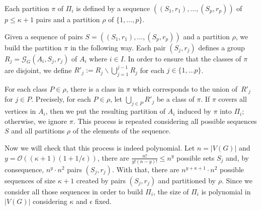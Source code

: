 Each partition \(\pi\) of \(\Pi_i\) is defined by a sequence \(((S_1, r_1), \dots, (S_p, r_p))\) of \(p \le \kappa + 1\) pairs and a partition \(\rho\) of \(\{1, \dots, p\}\).

Given a sequence of pairs \(S = ((S_1, r_1), \dots, (S_p, r_p))\) and a partition \(\rho\), we build the partition \(\pi\) in the following way. Each pair \((S_j, r_j)\) defines a group \(R_j = \mathcal{G}_G(A_i, S_j, r_j)\) of \(A_i\) where \(i\in I\). In order to ensure that the classes of \(\pi\) are disjoint, we define \(R'_j := R_j \backslash \bigcup^{j-1}_{j=1} R_j\) for each $j \in \{1, \ldots p\}$.

For each class \(P \in \rho\), there is a class in \(\pi\) which corresponds to the union of~\(R'_j\) for \(j \in P\). Precisely, for each \(P \in \rho\),  let \(\bigcup_{j \in P} R'_j\) be a class of \(\pi\). If \(\pi\) covers all vertices in \(A_i\), then we put the resulting partition of \(A_i\) induced by \(\pi\) into \(\Pi_i\); otherwise, we ignore \(\pi\). This process is repeated considering all possible sequences \(S\) and all partitions \(\rho\) of the elements of the sequence.

Now we will check that this process is indeed polynomial. Let \(n = |V(G)|\) and \(y = \mathcal{O}((\kappa + 1)(1 + 1/\epsilon))\), there are \(\frac{n!}{y! (n-y)!} \leq n^y\) possible sets \(S_j\) and, by consequence, \(n^y \cdot n^2\) pairs \((S_j, r_j)\). With that, there are \(n^{y + \kappa + 1} \cdot n^2\) possible sequences of size \(\kappa + 1\) created by pairs \((S_j, r_j)\) and partitioned by \(\rho\). Since we consider all those sequences in order to build \(\Pi_i\), the size of \(\Pi_i\) is polynomial in \(|V(G)|\) considering \(\kappa\) and \(\epsilon\) fixed.

